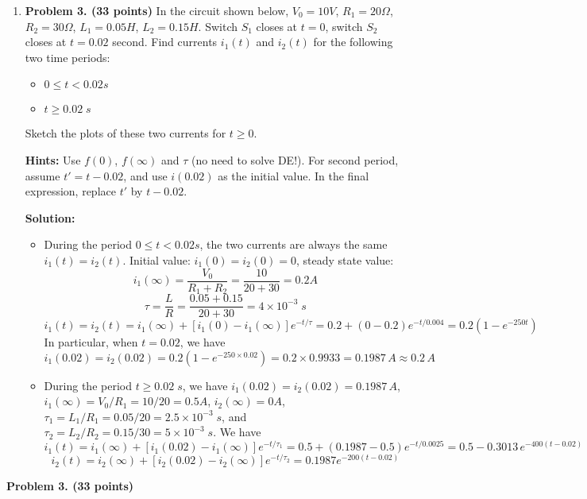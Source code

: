\begin{enumerate}
\item {\bf Problem 3. (33 points)} In the circuit shown below, $V_0=10V$,
$R_1=20\Omega$, $R_2=30\Omega$, $L_1=0.05H$, $L_2=0.15H$. Switch $S_1$ 
closes at $t=0$, switch $S_2$ closes at $t=0.02$ second. Find currents 
$i_1(t)$ and $i_2(t)$ for the following two time periods:
\begin{itemize}
\item $0\le t < 0.02 s$
\item $t \ge 0.02\;s$ 
\end{itemize}
Sketch the plots of these two currents for $t \ge 0$.

{\bf Hints:} Use $f(0)$, $f(\infty)$ and $\tau$ (no need to solve DE!).
For second period, assume $t'=t-0.02$, and use $i(0.02)$ as the initial 
value. In the final expression, replace $t'$ by $t-0.02$.


{\bf Solution:}
\begin{itemize}
\item During the period $0\le t < 0.02 s$, the two currents are always 
  the same $i_1(t)=i_2(t)$. Initial value: $i_1(0)=i_2(0)=0$, steady state
  value:
  \[
  i_1(\infty)=\frac{V_0}{R_1+R_2}=\frac{10}{20+30}=0.2A	
  \]
  \[
  \tau=\frac{L}{R}=\frac{0.05+0.15}{20+30}=4\times 10^{-3}\;s 	
  \]
  \[
  i_1(t)=i_2(t)=i_1(\infty)+[i_1(0)-i_1(\infty)]e^{-t/\tau}
  =0.2+(0-0.2) e^{-t/0.004}=0.2(1-e^{-250t})	
  \]
  In particular, when $t=0.02$, we have
  \[
  i_1(0.02)=i_2(0.02)=0.2(1-e^{-250\times 0.02})=0.2\times 0.9933=0.1987\,A
  \approx 0.2\,A
  \]

\item During the period $t \ge 0.02\;s$, we have 
  $i_1(0.02)=i_2(0.02)=0.1987\,A$, $i_1(\infty)=V_0/R_1=10/20=0.5A$, 
  $i_2(\infty)=0A$, $\tau_1=L_1/R_1=0.05/20=2.5\times 10^{-3}\;s$, and 
  $\tau_2=L_2/R_2=0.15/30=5\times 10^{-3}\;s$. We have
  \[
  i_1(t)=i_1(\infty)+[i_1(0.02)-i_1(\infty)]e^{-t/\tau_1}
  =0.5+(0.1987-0.5)e^{-t/0.0025}=0.5-0.3013\,e^{-400(t-0.02)} 
  \]
  \[
  i_2(t)=i_2(\infty)+[i_2(0.02)-i_2(\infty)]e^{-t/\tau_2}	
  =0.1987 e^{-200(t-0.02)}	
  \]

\end{itemize}



\end{enumerate}



\item {\bf Problem 3. (33 points)} 

